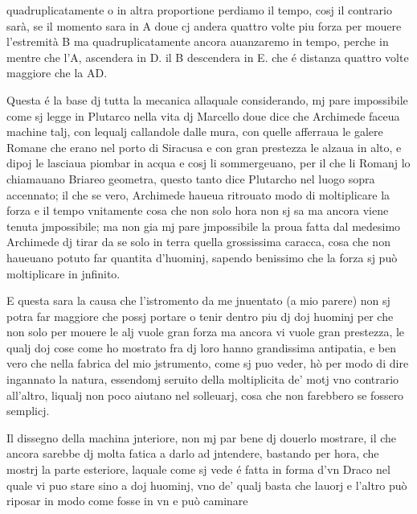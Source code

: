 \documentclass[11pt,a4paper]{article}
\begin{document}

quadruplicatamente o in altra proportione perdiamo il tempo, cosj il contrario sarà, se il momento sara in A doue cj andera quattro volte piu forza per mouere l'estremità B ma quadruplicatamente ancora auanzaremo in tempo, perche in mentre che l'A, ascendera in D. il B descendera in E. che é distanza quattro volte maggiore che la AD.

Questa é la base dj tutta la mecanica allaquale considerando, mj pare impossibile come sj legge in Plutarco nella vita dj Marcello doue dice che Archimede faceua machine talj, con lequalj callandole dalle mura, con quelle afferraua le galere Romane che erano nel porto di Siracusa e con gran prestezza le alzaua in alto, e dipoj le lasciaua piombar in acqua e cosj li sommergeuano, per il che li Romanj lo chiamauano Briareo geometra, questo tanto dice Plutarcho nel luogo sopra accennato; il che se vero, Archimede haueua ritrouato modo di moltiplicare la forza e il tempo vnitamente cosa che non solo hora non sj sa ma ancora viene tenuta jmpossibile; ma non gia mj pare jmpossibile la proua fatta dal medesimo Archimede dj tirar da se solo in terra quella grossissima caracca, cosa che non haueuano potuto far quantita d'huominj, sapendo benissimo che la forza sj può moltiplicare in jnfinito.

E questa sara la causa che l'istromento da me jnuentato (a mio parere) non sj potra far maggiore che possj portare o tenir dentro piu dj doj huominj per che non solo per mouere le alj vuole gran forza ma ancora vi vuole gran prestezza, le qualj doj cose come ho mostrato fra dj loro hanno grandissima antipatia, e ben vero che nella fabrica del mio jstrumento, come sj puo veder, hò per modo di dire ingannato la natura, essendomj seruito della moltiplicita de' motj vno contrario all'altro, liqualj non poco aiutano nel solleuarj, cosa che non farebbero se fossero semplicj.

Il dissegno della machina jnteriore, non mj par bene dj douerlo mostrare, il che ancora sarebbe dj molta fatica a darlo ad jntendere, bastando per hora, che mostrj la parte esteriore, laquale come sj vede é fatta in forma d'vn Draco nel quale vi puo stare sino a doj huominj, vno de' qualj basta che lauorj e l'altro può riposar in modo come fosse in vn  e può caminare
\end{document}
